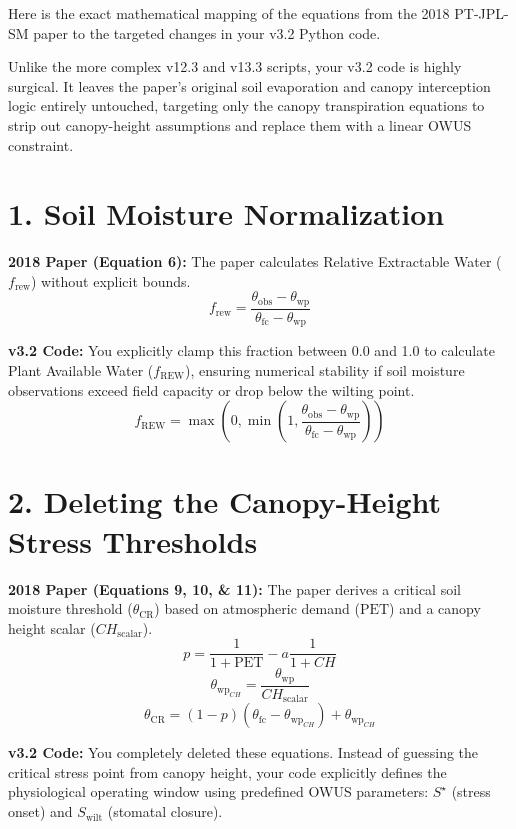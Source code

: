 \documentclass[11pt]{article}
\begin{document}
Here is the exact mathematical mapping of the equations from the 2018 PT-JPL-SM paper to the targeted changes in your v3.2 Python code.

Unlike the more complex v12.3 and v13.3 scripts, your v3.2 code is highly surgical. It leaves the paper's original soil evaporation and canopy interception logic entirely untouched, targeting only the canopy transpiration equations to strip out canopy-height assumptions and replace them with a linear OWUS constraint.

\section*{1. Soil Moisture Normalization}

\textbf{2018 Paper (Equation 6):} The paper calculates Relative Extractable Water ($f_{\mathrm{rew}}$) without explicit bounds.
\[
  f_{\mathrm{rew}} = \frac{\theta_{\mathrm{obs}} - \theta_{\mathrm{wp}}}{\theta_{\mathrm{fc}} - \theta_{\mathrm{wp}}}
\]

\textbf{v3.2 Code:} You explicitly clamp this fraction between 0.0 and 1.0 to calculate Plant Available Water ($f_{\mathrm{REW}}$), ensuring numerical stability if soil moisture observations exceed field capacity or drop below the wilting point.
\[
  f_{\mathrm{REW}} = \max\left(0, \min\left(1, \frac{\theta_{\mathrm{obs}} - \theta_{\mathrm{wp}}}{\theta_{\mathrm{fc}} - \theta_{\mathrm{wp}}}\right)\right)
\]

\section*{2. Deleting the Canopy-Height Stress Thresholds}

\textbf{2018 Paper (Equations 9, 10, \& 11):} The paper derives a critical soil moisture threshold ($\theta_{\mathrm{CR}}$) based on atmospheric demand ($\mathrm{PET}$) and a canopy height scalar ($CH_{\mathrm{scalar}}$).
\[
  p = \frac{1}{1 + \mathrm{PET}} - a\frac{1}{1 + CH}
\]
\[
  \theta_{\mathrm{wp}_{CH}} = \frac{\theta_{\mathrm{wp}}}{CH_{\mathrm{scalar}}}
\]
\[
  \theta_{\mathrm{CR}} = (1 - p)(\theta_{\mathrm{fc}} - \theta_{\mathrm{wp}_{CH}}) + \theta_{\mathrm{wp}_{CH}}
\]

\textbf{v3.2 Code:} You completely deleted these equations. Instead of guessing the critical stress point from canopy height, your code explicitly defines the physiological operating window using predefined OWUS parameters: $S^\star$ (stress onset) and $S_{\mathrm{wilt}}$ (stomatal closure).
\end{document}
